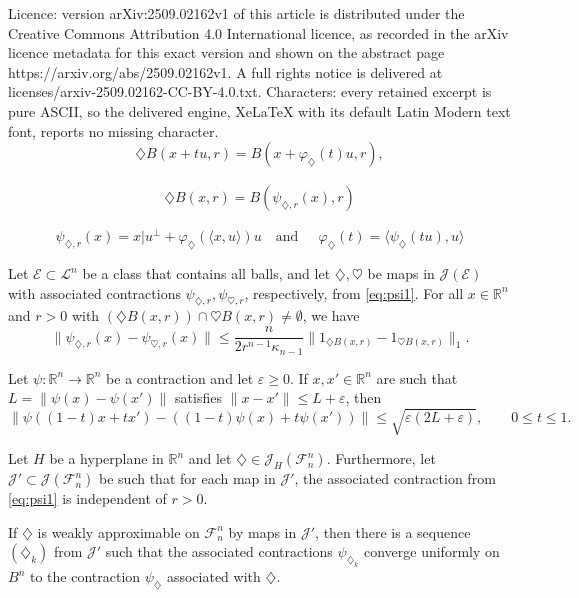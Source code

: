 \documentclass[10pt,a4paper]{amsart}
\newcommand{\R}{{\mathbb R}}
\newcommand{\cE}{{\mathcal E}}
\newcommand{\cF}{\mathcal F}
\newcommand{\cJ}{\mathcal J}
\newcommand{\cL}{\mathcal L}
\newcommand{\di}{\diamondsuit}
\newcommand{\ee}{\varepsilon}
\begin{document}
Licence: version arXiv:2509.02162v1 of this article is distributed under the Creative Commons Attribution 4.0 International licence, as recorded in the arXiv licence metadata for this exact version and shown on the abstract page https://arxiv.org/abs/2509.02162v1. A full rights notice is delivered at licenses/arxiv-2509.02162-CC-BY-4.0.txt. Characters: every retained excerpt is pure ASCII, so the delivered engine, XeLaTeX with its default Latin Modern text font, reports no missing character.
\begin{equation}\label{ball}
\di B(x+tu,r)=B\left(x+\varphi_{\di}(t)u,r\right),
\end{equation}

\begin{align}\label{eq:psi1}
\di B(x,r)=B(\psi_{\di,r}(x),r)
\end{align}

\begin{equation}\label{eq:omregn}
\psi_{\di,r}(x)=x|u^\perp+\varphi_{\di}(\langle x,u\rangle)u
\quad{\text{and}}~~\quad
\varphi_\di(t)=\langle \psi_\di(tu),u\rangle
\end{equation}

\begin{lem}\label{lem_balls_close}
Let $\cE\subset \cL^n$ be a class that contains all balls, and let  $\di,\heartsuit$ be maps in $\cJ(\cE)$ with associated contractions $\psi_{\di,r},\psi_{\heartsuit,r}$, respectively, from \eqref{eq:psi1}.
For all $x\in \R^n$ and $r>0$ with $(\di B(x,r))\cap \heartsuit B(x,r)\ne\emptyset$, we have
\[
\|\psi_{\di,r}(x)-\psi_{\heartsuit,r}(x)\|\le \frac{n}{2r^{n-1}\kappa_{n-1}}\|1_{\di B(x,r)}-1_{\heartsuit B(x,r)}\|_1.
\]
\end{lem}

\begin{lem}\label{lem_almost_affine}
Let $\psi:\R^n\to \R^n$ be a contraction and let $\ee\ge 0$. If $x,x'\in \R^n$ are such that $L=\|\psi(x)-\psi(x')\|$ satisfies $\|x-x'\|\le L+\ee$, then
\[
\|\psi((1-t)x+tx')-((1-t)\psi(x)+t\psi(x'))\|
\le \sqrt{\ee(2L+\ee)}, \qquad 0\le t\le 1.
\]
\end{lem}

\begin{thm}\label{thm:not_weaklyfiniteBalls}
Let $H$ be a hyperplane in $\R^n$ and let $\di\in \cJ_H(\cF_n^n)$. Furthermore, let $\cJ'\subset \cJ(\cF_n^n)$ be such that for each map in $\cJ'$, the associated contraction from \eqref{eq:psi1} is independent of $r>0$.

If $\di$ is weakly approximable on ${\cF}_n^n$ by maps in $\cJ'$, then there is a sequence $(\di_k)$ from $\cJ'$ such that the associated contractions $\psi_{\di_k}$ converge uniformly on $B^n$ to the contraction $\psi_{\di}$ associated with $\di$.
\end{thm}
\end{document}

